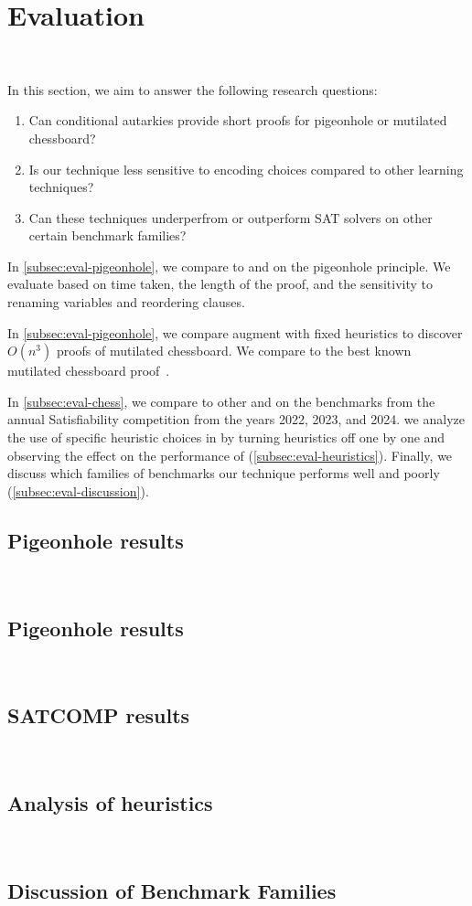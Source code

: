 \section{Evaluation}~\label{sec:evaluation}

In this section, we aim to answer the following research questions:


\begin{enumerate}
    \item Can conditional autarkies provide short \pr proofs for pigeonhole or mutilated chessboard?
    \item Is our technique less sensitive to encoding choices compared to other
    \pr learning techniques?
    \item Can these techniques underperfrom or outperform SAT solvers on other certain benchmark
    families?
\end{enumerate}


In \autoref{subsec:eval-pigeonhole}, we compare \tool to \cadical and \sadical
on the pigeonhole principle. We evaluate based on time taken, the length of
the proof, and the sensitivity to renaming variables and reordering clauses. 

In \autoref{subsec:eval-pigeonhole}, we compare augment \tool with fixed
heuristics to discover $O(n^3)$ proofs of mutilated chessboard. We compare to the best known
mutilated chessboard \pr proof~\cite{mutilatedchessboard-pr}.

In \autoref{subsec:eval-chess}, we compare \tool to other \cadical and \prelearn
on the benchmarks from the annual Satisfiability competition from the years
2022, 2023, and 2024. we analyze the use of specific heuristic choices in \tool by turning
heuristics off one by one and observing the effect on the performance of \tool (\autoref{subsec:eval-heuristics}). Finally, we discuss which families
of benchmarks our technique performs well and poorly (\autoref{subsec:eval-discussion}).

\subsection{Pigeonhole results}~\label{subsec:eval-pigeonhole}

\subsection{Pigeonhole results}~\label{subsec:eval-chess}


\subsection{SATCOMP results}~\label{subsec:eval-satcomp}

\subsection{Analysis of heuristics}~\label{subsec:eval-heuristics}

\subsection{Discussion of Benchmark Families}~\label{subsec:eval-discussion}
